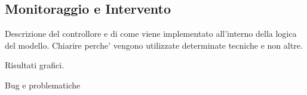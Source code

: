 \subsection{Monitoraggio e Intervento}

Descrizione del controllore e di come viene implementato all'interno
della logica del modello. Chiarire perche' vengono utilizzate
determinate tecniche e non altre. 

Risultati grafici.

Bug e problematiche